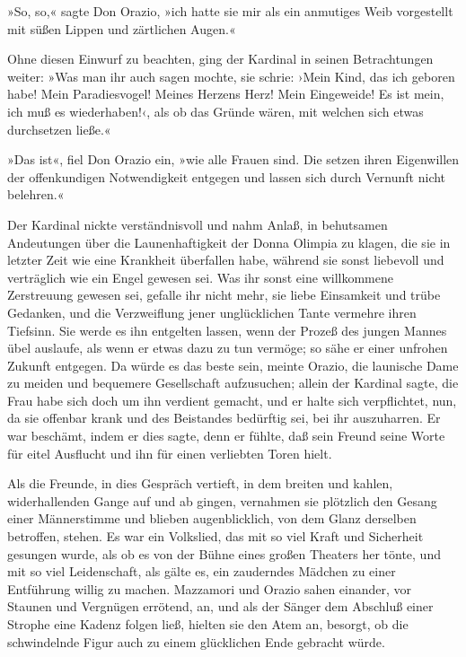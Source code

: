 »So, so,« sagte Don Orazio, »ich hatte sie mir als ein anmutiges
Weib vorgestellt mit süßen Lippen und zärtlichen Augen.«

Ohne diesen Einwurf zu beachten, ging der Kardinal in seinen
Betrachtungen weiter: »Was man ihr auch sagen mochte, sie schrie:
›Mein Kind, das ich geboren habe! Mein Paradiesvogel! Meines
Herzens Herz! Mein Eingeweide! Es ist mein, ich muß es
wiederhaben!‹, als ob das Gründe wären, mit welchen sich etwas
durchsetzen ließe.«

»Das ist«, fiel Don Orazio ein, »wie alle Frauen sind. Die setzen
ihren Eigenwillen der offenkundigen Notwendigkeit entgegen und
lassen sich durch Vernunft nicht belehren.«

\pagenum{[65]} Der Kardinal nickte verständnisvoll und nahm Anlaß,
in behutsamen Andeutungen über die Launenhaftigkeit der Donna
Olimpia zu klagen, die sie in letzter Zeit wie eine Krankheit
überfallen habe, während sie sonst liebevoll und verträglich wie
ein Engel gewesen sei. Was ihr sonst eine willkommene Zerstreuung
gewesen sei, gefalle ihr nicht mehr, sie liebe Einsamkeit und trübe
Gedanken, und die Verzweiflung jener unglücklichen Tante vermehre
ihren Tiefsinn. Sie werde es ihn entgelten lassen, wenn der Prozeß
des jungen Mannes übel auslaufe, als wenn er etwas dazu zu tun
vermöge; so sähe er einer unfrohen Zukunft entgegen. Da würde es
das beste sein, meinte Orazio, die launische Dame zu meiden und
bequemere Gesellschaft aufzusuchen; allein der Kardinal sagte, die
Frau habe sich doch um ihn verdient gemacht, und er halte sich
verpflichtet, nun, da sie offenbar krank und des Beistandes
bedürftig sei, bei ihr auszuharren. Er war beschämt, indem er dies
sagte, denn er fühlte, daß sein Freund seine Worte für eitel
Ausflucht und ihn für einen verliebten Toren hielt.

Als die Freunde, in dies Gespräch vertieft, in dem breiten und
kahlen, widerhallenden Gange auf und ab gingen, vernahmen sie
plötzlich den Gesang einer Männerstimme und blieben augenblicklich,
von dem Glanz derselben betroffen, stehen. Es war ein Volkslied,
das mit so viel Kraft und Sicherheit gesungen wurde, als ob es von
der Bühne eines großen Theaters her tönte, und mit so viel
Leidenschaft, als gälte es, ein zauderndes Mädchen zu einer
Entführung willig zu machen. Mazzamori und Orazio sahen einander,
vor Staunen und Vergnügen errötend, an, und als der Sänger dem
Abschluß einer Strophe eine Kadenz folgen ließ, hielten sie den
Atem an, besorgt, ob die schwindelnde Figur auch zu einem
glücklichen Ende gebracht würde.

